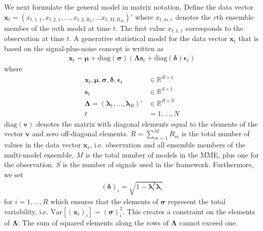 \documentclass[12pt]{article}
\renewcommand{\vec}[1]{\bm{#1}}
\newcommand{\mat}[1]{\bm{#1}}
\newcommand{\diag}{\text{diag}}
\newcommand{\var}{\text{Var}}
\begin{document}
We next formulate the general model in matrix notation.
Define the data vector $\vec{x}_t = (x_{t,1,1}, x_{t,2,1}, \dots,x_{t,2,R_2}, \dots x_{t,M,R_M})'$ where $x_{t,m,r}$ denotes the $r$th ensemble member of the $m$th model at time $t$.
The first value $x_{t,1,1}$ corresponds to the observation at time $t$.
A generative statistical model for the data vector $\vec{x}_t$ that is based on the signal-plus-noise concept is written as
%
\begin{align}
\vec{x}_t = \vec{\mu} + \diag(\vec{\sigma}) (\mat{\Lambda} \vec{s}_t + \diag(\vec{\delta}) \vec{\epsilon}_t)
\end{align}
%
where 
%
\begin{align}
\vec{x}_t, \vec{\mu}, \vec{\sigma}, \vec{\delta}, \vec{\epsilon}_t & \in \mathbb{R}^{R\times 1}\\
\vec{s}_t & \in \mathbb{R}^{S\times 1}\\
\mat{\Lambda} = (\vec{\lambda}_1, \dots, \vec{\lambda}_R)' & \in \mathbb{R}^{R\times S}\\
t & = 1, \dots, N
\end{align}
%
$\diag(\vec{v})$ denotes the matrix with diagonal elements equal to the elements of the vector $\vec{v}$ and zero off-diagonal elements.
$R=\sum_{m=1}^M R_m$ is the total number of values in the data vector $\vec{x}_t$, i.e. observation and all ensemble members of the multi-model ensemble.
$M$ is the total number of models in the MME, plus one for the observation.
$S$ is the number of signals used in the framework.
Furthermore, we set 
%
\begin{align}
(\vec{\delta})_i = \sqrt{1 - \vec{\lambda}_i^T\vec{\lambda}_i}
\end{align} 
%
for $i = 1, \dots, R$ which ensures that the elements of $\vec{\sigma}$ represent the total variability, i.e. $\var[(\vec{x}_t)_i] = (\vec{\sigma})_i^2$.
This creates a constraint on the elements of $\mat{\Lambda}$: The sum of squared elements along the rows of $\mat{\Lambda}$ cannot exceed one.
\end{document}
